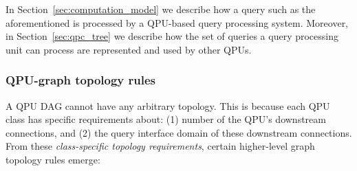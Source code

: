 In Section~\ref{sec:computation_model} we describe how a query such as the aforementioned is processed by a QPU-based
query processing system.
Moreover, in Section~\ref{sec:qpc_tree} we describe how the set of queries a query processing unit can process are
represented and used by other QPUs.

\subsubsection{QPU-graph topology rules}
\label{sec:graph_topology}
A QPU DAG cannot have any arbitrary topology.
This is because each QPU class has specific requirements about:
(1) number of the QPU's downstream connections, and (2) the query interface domain of these downstream connections.
From these \textit{class-specific topology requirements}, certain higher-level graph topology rules emerge:
